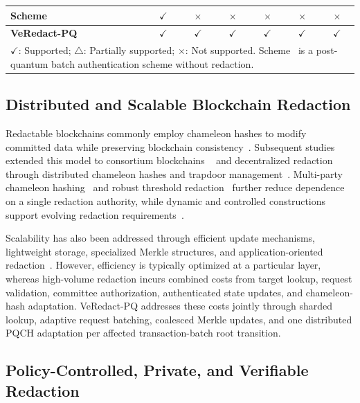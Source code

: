 \documentclass[lettersize,journal]{IEEEtran}
\begin{document}
\begin{table}[t]
\begin{tabular}{lcccccc}
Scheme~\cite{ref39}
& $\checkmark$ & $\times$ & $\times$ & $\times$
& $\times$ & $\times$ \\

\hline
\textbf{VeRedact-PQ}
& $\checkmark$ & $\checkmark$ & $\checkmark$
& $\checkmark$ & $\checkmark$ & $\checkmark$ \\
\hline

\multicolumn{7}{l}{
\footnotesize $\checkmark$: Supported;
$\triangle$: Partially supported;
$\times$: Not supported. Scheme~\cite{ref39} is a
post-quantum batch authentication scheme without redaction.}
\end{tabular}
\end{table}
    \subsection{Distributed and Scalable Blockchain Redaction}
    
    Redactable blockchains commonly employ chameleon hashes to modify
    committed data while preserving blockchain consistency~\cite{ref9}.
    Subsequent studies extended this model to consortium blockchains
    ~\cite{ref2} and decentralized redaction through distributed chameleon
    hashes and trapdoor management~\cite{ref1,ref3,ref6,ref19}.
    Multi-party chameleon hashing~\cite{ref12} and robust threshold
    redaction~\cite{ref27} further reduce dependence on a single redaction
    authority, while dynamic and controlled constructions support evolving
    redaction requirements~\cite{ref5,ref16,ref36}.
    
    Scalability has also been addressed through efficient update
    mechanisms, lightweight storage, specialized Merkle structures, and
    application-oriented redaction~\cite{ref14,ref20,ref21,ref23,ref26}.
    However, efficiency is typically optimized at a particular layer,
    whereas high-volume redaction incurs combined costs from target lookup,
    request validation, committee authorization, authenticated state
    updates, and chameleon-hash adaptation. VeRedact-PQ addresses these
    costs jointly through sharded lookup, adaptive request batching,
    coalesced Merkle updates, and one distributed PQCH adaptation per
    affected transaction-batch root transition.
    
    \subsection{Policy-Controlled, Private, and Verifiable Redaction}
    
\end{document}
